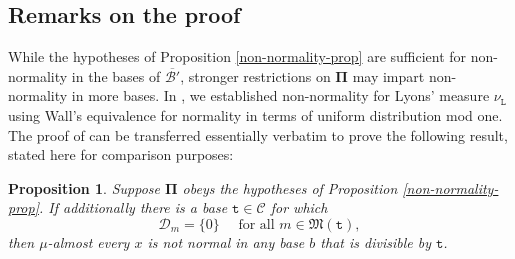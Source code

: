 \documentclass[12pt, twoside]{article}
\newtheorem{proposition}[theorem]{Proposition}
\theoremstyle{definition}
\numberwithin{equation}{section}
\begin{document}
\subsection{Remarks on the proof} \label{nonnormality-discussion-section} 
While the hypotheses of Proposition \ref{non-normality-prop} are sufficient for non-normality in the bases of $\overline{\mathscr{B}'}$, stronger restrictions on $\pmb{\Pi}$ may impart non-normality in more bases. In \cite[Section 3]{PZ-1}, we established non-normality for Lyons' measure $\nu_{\mathtt L}$ using Wall's \cite{w49} equivalence for normality in terms of uniform distribution mod one. The proof of \cite[Proposition 3.2]{PZ-1} can be transferred essentially verbatim to prove the following result, stated here for comparison purposes: 
\begin{proposition} \label{less-than-maximal-nonnormaility-prop}
Suppose $\pmb{\Pi}$ obeys the hypotheses of Proposition \ref{non-normality-prop}. If additionally there is a base $\mathtt t \in \mathscr{C}$ for which 
\[ \mathscr{D}_m = \{0\} \quad \text{ for all } m \in \mathfrak M(\mathtt t),  \]
then $\mu$-almost every $x$ is not normal in any base $b$ that is divisible by $\mathtt t$.   
\end{proposition}
\end{document}
